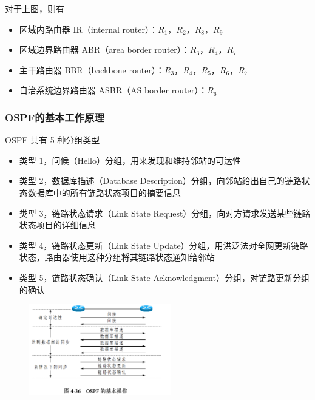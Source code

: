 \documentclass[cs4size,a4paper,10pt]{ctexart}
\begin{document}
	对于上图，则有
	\begin{itemize}
		\item 区域内路由器 IR（internal router）：$R_1$，$R_2$，$R_8$，$R_9$
		\item 区域边界路由器 ABR（area border router）：$R_3$，$R_4$，$R_7$
		\item 主干路由器 BBR（backbone router）：$R_3$，$R_4$，$R_5$，$R_6$，$R_7$
		\item 自治系统边界路由器 ASBR（AS border router）：$R_6$
	\end{itemize}

	\subsubsection{OSPF的基本工作原理}

	OSPF 共有 5 种分组类型
	\begin{itemize}
		\item 类型 1，问候（Hello）分组，用来发现和维持邻站的可达性
		\item 类型 2，数据库描述（Database Description）分组，向邻站给出自己的链路状态数据库中的所有链路状态项目的摘要信息
		\item 类型 3，链路状态请求（Link State Request）分组，向对方请求发送某些链路状态项目的详细信息
		\item 类型 4，链路状态更新（Link State Update）分组，用洪泛法对全网更新链路状态，路由器使用这种分组将其链路状态通知给邻站
		\item 类型 5，链路状态确认（Link State Acknowledgment）分组，对链路更新分组的确认
	\end{itemize}
	
	\begin{figure}[H]
		\centering
		\includegraphics[width=0.55\textwidth]{img/4.36}
	\end{figure}
\end{document}

